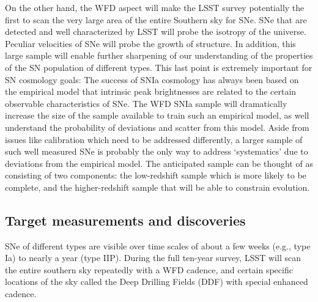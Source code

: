 On the other hand, the WFD aspect will make the LSST survey potentially the
first to scan the very large area of the entire Southern sky for SNe. SNe
that are detected and well characterized by LSST will probe the isotropy of
the universe.  Peculiar velocities of SNe will probe the growth of
structure.  In addition, this large sample will enable further sharpening
of our understanding of the properties of the SN population of different
types. This last point is extremely important for SN cosmology goals:  The
success of SNIa cosmology has always been based on the empirical model that
intrinsic peak brightnesses are related to the certain observable
characteristics of SNe. 
The WFD SNIa sample will dramatically increase the size of the sample
available to train such an empirical model, as well understand the
probability of deviations and scatter from this model. Aside from issues
like calibration which need to be addressed differently, a larger sample of
such well measured SNe is probably the only way to address `systematics'
due to deviations from the empirical model. The anticipated sample can be
thought of as consisting of two components:  the low-redshift sample which
is more likely to be complete, and the higher-redshift sample that will be
able to constrain evolution. 

\subsection{Target measurements and discoveries}
\label{sec:keyword:targets}


SNe of different types are visible over time scales of about a few 
weeks (e.g., type Ia) to nearly a year (type IIP).  During the full ten-year
 survey, LSST will scan the entire southern sky repeatedly
 with a WFD cadence, and certain specific locations
of the sky called the Deep Drilling Fields (DDF) with special enhanced cadence. 

